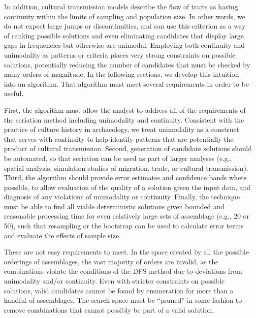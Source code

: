\documentclass[10pt,letterpaper]{article}
\begin{document}
In addition, cultural transmission models describe the flow of traits as having continuity within the limits of sampling and population size. In other words, we do not expect large jumps or discontinuities, and can use this criterion as a way of ranking possible solutions and even eliminating candidates that display large gaps in frequencies but otherwise are unimodal. Employing both continuity and unimodality as patterns or criteria places very strong constraints on possible solutions, potentially reducing the number of candidates that must be checked by many orders of magnitude. In the following sections, we develop this intuition into an algorithm. That algorithm must meet several requirements in order to be useful. 

First, the algorithm must allow the analyst to address all of the requirements of the seriation method including unimodality and continuity. Consistent with the practice of culture history in archaeology, we treat unimodality as a construct that serves with continuity to help identify patterns that are potentially the product of cultural transmission. Second, generation of candidate solutions should be automated, so that seriation can be used as part of larger analyses (e.g., spatial analysis, simulation studies of migration, trade, or cultural transmission). Third, the algorithm should provide error estimates and confidence bands where possible, to allow evaluation of the quality of a solution given the input data, and diagnosis of any violations of unimodality or continuity. Finally, the technique must be able to find all viable deterministic solutions given bounded and reasonable processing time for even relatively large sets of assemblage (e.g., 20 or 50), such that resampling or the bootstrap can be used to calculate error terms and evaluate the effects of sample size. 

These are not easy requirements to meet. In the space created by all the possible orderings of assemblages, the vast majority of orders are invalid, as the combinations violate the conditions of the DFS method due to deviations from unimodality and/or continuity. Even with stricter constraints on possible solutions, valid candidates cannot be found by enumeration for more than a handful of assemblages. The search space must be ``pruned'' in some fashion to remove combinations that cannot possibly be part of a valid solution. 
\end{document}
